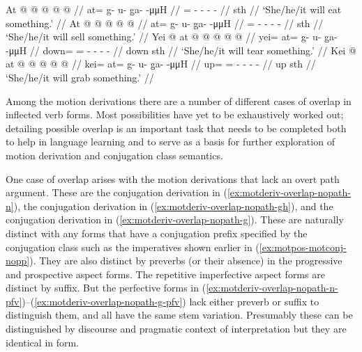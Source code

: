 \documentclass[12pt,letterpaper,oneside,article]{memoir}
\begin{document}
\pex\label{ex:motderiv-overlap-prosp}%
\a\label{ex:motderiv-overlap-prosp-z}%
%
\begingl
	\gla	At @  @ {} @ {} @ {} @ {} //
	\glb	at= g- u- g̱a-  -μμH //
	\glc	{}= - - -  - //
	\gld	sth\•  {} {} {} {} //
	\glft	‘She/he/it will eat something.’
		//
\endgl
\a\label{ex:motderiv-overlap-prosp-n}%
%
\begingl
	\gla	At @  @ {} @ {} @ {} @ {} //
	\glb	at= g- u- g̱a-  -μμH //
	\glc	{}= - - -  - //
	\gld	sth\•  {} {} {} {} //
	\glft	‘She/he/it will sell something.’
		//
\endgl
\a\label{ex:motderiv-overlap-prosp-gh}%
%
\begingl
	\gla	Yei @ at @  @ {} @ {} @ {} @ {} //
	\glb	yei= at= g- u- g̱a-  -μμH //
	\glc	down= = - - -  - //
	\gld	down\• sth\•  {} {} {} {} //
	\glft	‘She/he/it will tear something.’
		//
\endgl
\a\label{ex:motderiv-overlap-prosp-g}%
%
\begingl
	\gla	Kei @ at @  @ {} @ {} @ {} @ {} //
	\glb	kei= at= g- u- g̱a-  -μμH //
	\glc	up= = - - -  - //
	\gld	up\• sth\•  {} {} {} {} //
	\glft	‘She/he/it will grab something.’
		//
\endgl
\xe

Among the motion derivations there are a number of different cases of overlap in inflected verb forms.
Most possibilities have yet to be exhaustively worked out; detailing possible overlap is an important task that needs to be completed both to help in language learning and to serve as a basis for further exploration of motion derivation and conjugation class semantics.

One case of overlap arises with the motion derivations that lack an overt path argument.
These are the  conjugation derivation in (\ref{ex:motderiv-overlap-nopath-n}), the  conjugation derivation in (\ref{ex:motderiv-overlap-nopath-gh}), and the  conjugation derivation in (\ref{ex:motderiv-overlap-nopath-g}).
These are naturally distinct with any forms that have a conjugation prefix specified by the conjugation class such as the imperatives shown earlier in (\ref{ex:motpos-motconj-nopp}).
They are also distinct by preverbs (or their absence) in the progressive and prospective aspect forms.
The repetitive imperfective aspect forms are distinct by suffix.
But the perfective forms in (\ref{ex:motderiv-overlap-nopath-n-pfv})–(\ref{ex:motderiv-overlap-nopath-g-pfv}) lack either preverb or suffix to distinguish them, and all have the same  stem variation.
Presumably these can be distinguished by discourse and pragmatic context of interpretation but they are identical in form.
\end{document}
